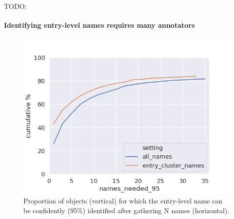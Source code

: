 TODO: 


\paragraph{Identifying entry-level names requires many annotators}

\begin{figure}[t]
	\includegraphics[width=\columnwidth]{images/stability_analytic.png}
	\caption{Proportion of objects (vertical) for which the entry-level name can be confidently (95\%) identified after gathering N names (horizontal). }
	\label{fig:entry-level-name-stability}
\end{figure}
